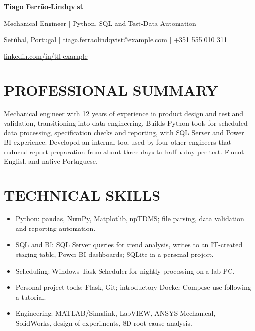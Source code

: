 \documentclass[11pt,a4paper]{article}
\newcommand{\cvsection}[1]{\Needspace{4\baselineskip}\section*{#1}}
\begin{document}
{\LARGE\bfseries\color{primarycolor} Tiago Ferrão-Lindqvist}\par
{\large\color{accentcolor} Mechanical Engineer | Python, SQL and Test-Data Automation}\par
Setúbal, Portugal | tiago.ferraolindqvist@example.com | +351 555 010 311\par
\href{https://linkedin.com/in/tfl-example}{linkedin.com/in/tfl-example}

\cvsection{PROFESSIONAL SUMMARY}
Mechanical engineer with 12 years of experience in product design and test and validation, transitioning into data engineering. Builds Python tools for scheduled data processing, specification checks and reporting, with SQL Server and Power BI experience. Developed an internal tool used by four other engineers that reduced report preparation from about three days to half a day per test. Fluent English and native Portuguese.

\cvsection{TECHNICAL SKILLS}
\begin{itemize}
\item Python: pandas, NumPy, Matplotlib, npTDMS; file parsing, data validation and reporting automation.
\item SQL and BI: SQL Server queries for trend analysis, writes to an IT-created staging table, Power BI dashboards; SQLite in a personal project.
\item Scheduling: Windows Task Scheduler for nightly processing on a lab PC.
\item Personal-project tools: Flask, Git; introductory Docker Compose use following a tutorial.
\item Engineering: MATLAB/Simulink, LabVIEW, ANSYS Mechanical, SolidWorks, design of experiments, 8D root-cause analysis.
\end{itemize}
\end{document}
